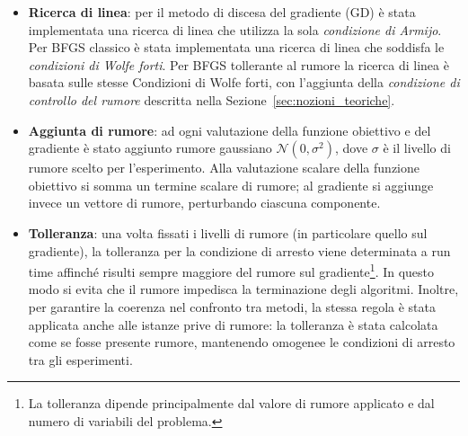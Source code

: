 \begin{itemize}
    \item \textbf{Ricerca di linea}: per il metodo di discesa del gradiente (GD) è stata implementata una ricerca di linea che utilizza la sola \emph{condizione di Armijo}. Per BFGS classico è stata implementata una ricerca di linea che soddisfa le \emph{condizioni di Wolfe forti}. Per BFGS tollerante al rumore la ricerca di linea è basata sulle stesse Condizioni di Wolfe forti, con l’aggiunta della \emph{condizione di controllo del rumore} descritta nella Sezione~\ref{sec:nozioni_teoriche}.
    
    \item \textbf{Aggiunta di rumore}: ad ogni valutazione della funzione obiettivo e del gradiente è stato aggiunto rumore gaussiano \(\mathcal{N}(0,\sigma^2)\), dove \(\sigma\) è il livello di rumore scelto per l’esperimento. Alla valutazione scalare della funzione obiettivo si somma un termine scalare di rumore; al gradiente si aggiunge invece un vettore di rumore, perturbando ciascuna componente.

    \item \textbf{Tolleranza}: una volta fissati i livelli di rumore (in particolare quello sul gradiente), la tolleranza per la condizione di arresto viene determinata a run time affinché risulti sempre maggiore del rumore sul gradiente\footnote{La tolleranza dipende principalmente dal valore di rumore applicato e dal numero di variabili del problema.}. In questo modo si evita che il rumore impedisca la terminazione degli algoritmi. Inoltre, per garantire la coerenza nel confronto tra metodi, la stessa regola è stata applicata anche alle istanze prive di rumore: la tolleranza è stata calcolata come se fosse presente rumore, mantenendo omogenee le condizioni di arresto tra gli esperimenti.
\end{itemize}


